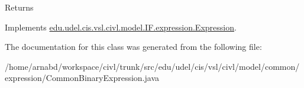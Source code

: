 \begin{DoxyReturn}{Returns}

\end{DoxyReturn}


Implements \hyperlink{interfaceedu_1_1udel_1_1cis_1_1vsl_1_1civl_1_1model_1_1IF_1_1expression_1_1Expression_ac2ad0236534bec54b91ee78ff658cbe0}{edu.\+udel.\+cis.\+vsl.\+civl.\+model.\+I\+F.\+expression.\+Expression}.



The documentation for this class was generated from the following file\+:\begin{DoxyCompactItemize}
\item 
/home/arnabd/workspace/civl/trunk/src/edu/udel/cis/vsl/civl/model/common/expression/Common\+Binary\+Expression.\+java\end{DoxyCompactItemize}
